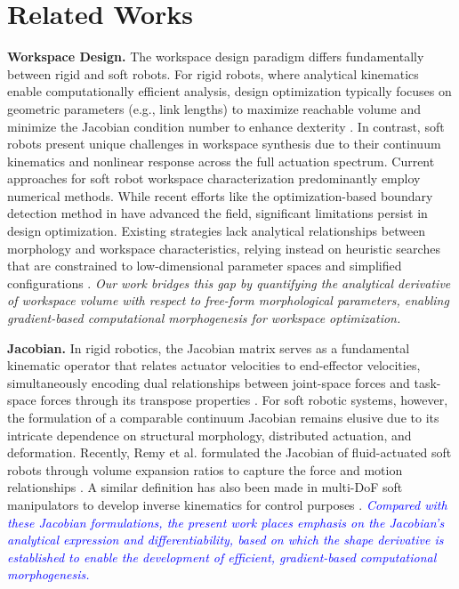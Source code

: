 \documentclass[journal]{IEEEtran}
\theoremstyle{definition}
\begin{document}
\section{Related Works}
\label{sec:related_works}

\textbf{Workspace Design.} The workspace design paradigm differs fundamentally between rigid and soft robots. For rigid robots, where analytical kinematics enable computationally efficient analysis, design optimization typically focuses on geometric parameters (e.g., link lengths) to maximize reachable volume \cite{Hosseini_Daniali_Taghirad_2011, Zhao_Wu_Yang_Chen_Chen_Xiong_Zhang_2022} and minimize the Jacobian condition number to enhance dexterity \cite{Kucuk_2018}. In contrast, soft robots present unique challenges in workspace synthesis due to their continuum kinematics and nonlinear response across the full actuation spectrum. Current approaches for soft robot workspace characterization predominantly employ numerical methods. While recent efforts like the optimization-based boundary detection method in \cite{9488225} have advanced the field, significant limitations persist in design optimization. Existing strategies lack analytical relationships between morphology and workspace characteristics, relying instead on heuristic searches that are constrained to low-dimensional parameter spaces and simplified configurations \cite{Peng_Zhang_Ge_Gu_2019, Huang_Zhao_Liu_Chen_Liu_2024, amehri_tel_04028186}. \textit{Our work bridges this gap by quantifying the analytical derivative of workspace volume with respect to free-form morphological parameters, enabling gradient-based computational morphogenesis for workspace optimization.}

\textbf{Jacobian.} In rigid robotics, the Jacobian matrix serves as a fundamental kinematic operator that relates actuator velocities to end-effector velocities, simultaneously encoding dual relationships between joint-space forces and task-space forces through its transpose properties \cite{Chen_Zhang_Li_2018, Chien_Chern_Cheah_Hirano_Kawamura_Arimoto_2003}. For soft robotic systems, however, the formulation of a comparable continuum Jacobian remains elusive due to its intricate dependence on structural morphology, distributed actuation, and deformation. Recently, Remy et al. formulated the Jacobian of fluid-actuated soft robots through volume expansion ratios to capture the force and motion relationships \cite{Remy_Brei_Bruder_Remy_Buffinton_Gillespie_2023}. A similar definition has also been made in multi-DoF soft manipulators to develop inverse kinematics for control purposes \cite{Chen_Renda_Gall_Mocellin_Bernabei_Dangel_Ciuti_Cianchetti_Stefanini_2024, Fang_Tian_Yang_Geraedts_Wang_2022, Giorelli_Renda_Calisti_Arienti_Ferri_Laschi_2015}. \textit{\textcolor{blue}{Compared with these Jacobian formulations, the present work places emphasis on the Jacobian's analytical expression and differentiability, based on which the shape derivative is established to enable the development of efficient, gradient-based computational morphogenesis.}}
\end{document}

